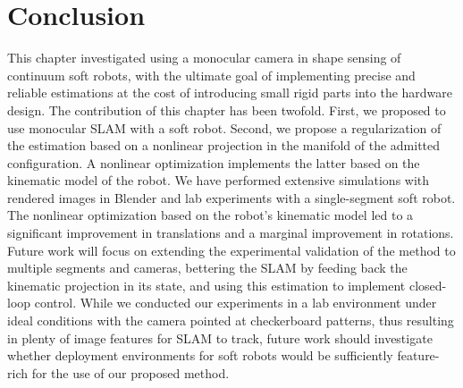 \section{Conclusion}
\label{sec:srslam:conclusions}

This chapter investigated using a monocular camera in shape sensing of continuum soft robots, with the ultimate goal of implementing precise and reliable estimations at the cost of introducing small rigid parts into the hardware design. The contribution of this chapter has been twofold. First, we proposed to use monocular \gls{SLAM} with a soft robot. Second, we propose a regularization of the estimation based on a nonlinear projection in the manifold of the admitted configuration. A nonlinear optimization implements the latter based on the kinematic model of the robot. We have performed extensive simulations with rendered images in Blender and lab experiments with a single-segment soft robot. The nonlinear optimization based on the robot's kinematic model led to a significant improvement in translations and a marginal improvement in rotations. 
Future work will focus on extending the experimental validation of the method to multiple segments and cameras, bettering the SLAM by feeding back the kinematic projection in its state, and using this estimation to implement closed-loop control.
While we conducted our experiments in a lab environment under ideal conditions with the camera pointed at checkerboard patterns, thus resulting in plenty of image features for \gls{SLAM} to track, future work should investigate whether deployment environments for soft robots would be sufficiently feature-rich for the use of our proposed method.

